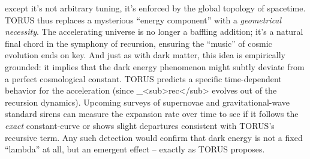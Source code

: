\documentclass[
]{article}
\begin{document}
except it's not arbitrary tuning, it's enforced by the global topology
of spacetime. TORUS thus replaces a mysterious ``energy component'' with
a \emph{geometrical necessity}. The accelerating universe is no longer a
baffling addition; it's a natural final chord in the symphony of
recursion, ensuring the ``music'' of cosmic evolution ends on key. And
just as with dark matter, this idea is empirically grounded: it implies
that the dark energy phenomenon might subtly deviate from a perfect
cosmological constant. TORUS predicts a specific time-dependent behavior
for the acceleration (since
\Lambda\_\textless sub\textgreater rec\textless/sub\textgreater{} evolves out
of the recursion dynamics)\hspace{0pt}. Upcoming surveys of supernovae
and gravitational-wave standard sirens can measure the expansion rate
over time to see if it follows the \emph{exact} constant-\Lambda curve or
shows slight departures consistent with TORUS's recursive
term\hspace{0pt}. Any such detection would confirm that dark energy is
not a fixed ``lambda'' at all, but an emergent effect -- exactly as
TORUS proposes.
\end{document}
